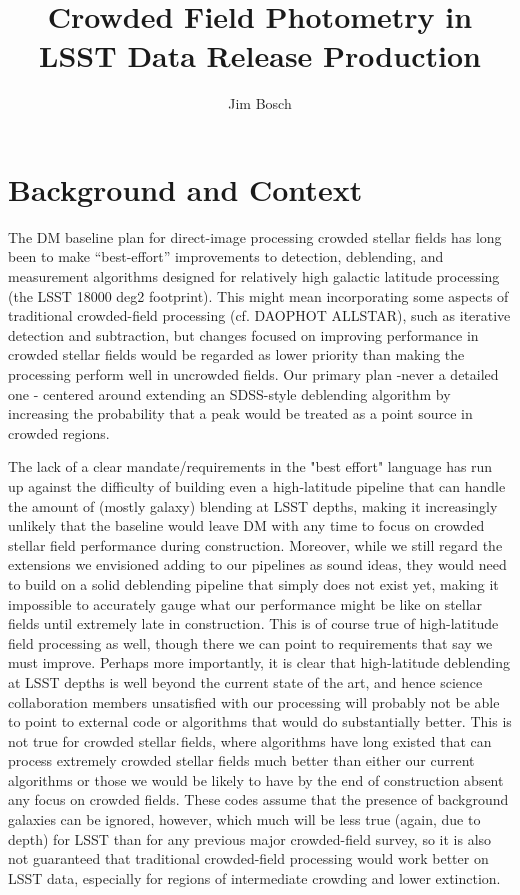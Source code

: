 \documentclass[DM,authoryear,toc]{lsstdoc}
\title{Crowded Field Photometry in LSST Data Release Production}
\author{%
Jim Bosch
}
\date{\vcsDate}
\begin{document}
\maketitle

\section{Background and Context}

The DM baseline plan for direct-image processing crowded stellar fields has long been to make ``best-effort'' improvements to detection, deblending, and measurement algorithms designed for relatively high galactic latitude processing (the LSST 18000 deg2 footprint).
This might mean incorporating some aspects of traditional crowded-field processing (cf. DAOPHOT ALLSTAR), such as iterative detection and subtraction, but changes focused on improving performance in crowded stellar fields would be regarded as lower priority than making the processing perform well in uncrowded fields.
Our primary plan -never a detailed one - centered around extending an SDSS-style deblending algorithm by increasing the probability that a peak would be treated as a point source in crowded regions.

The lack of a clear mandate/requirements in the "best effort" language has run up against the difficulty of building even a high-latitude pipeline that can handle the amount of (mostly galaxy) blending at LSST depths, making it increasingly unlikely that the baseline would leave DM with any time to focus on crowded stellar field performance during construction.
Moreover, while we still regard the extensions we envisioned adding to our pipelines as sound ideas, they would need to build on a solid deblending pipeline that simply does not exist yet, making it impossible to accurately gauge what our performance might be like on stellar fields until extremely late in construction.
This is of course true of high-latitude field processing as well, though there we can point to requirements that say we must improve.
Perhaps more importantly, it is clear that high-latitude deblending at LSST depths is well beyond the current state of the art, and hence science collaboration members unsatisfied with our processing will probably not be able to point to external code or algorithms that would do substantially better.
This is not true for crowded stellar fields, where algorithms have long existed that can process extremely crowded stellar fields much better than either our current algorithms or those we would be likely to have by the end of construction absent any focus on crowded fields.
These codes assume that the presence of background galaxies can be ignored, however, which much will be less true (again, due to depth) for LSST than for any previous major crowded-field survey, so it is also not guaranteed that traditional crowded-field processing would work better on LSST data, especially for regions of intermediate crowding and lower extinction.
\end{document}
